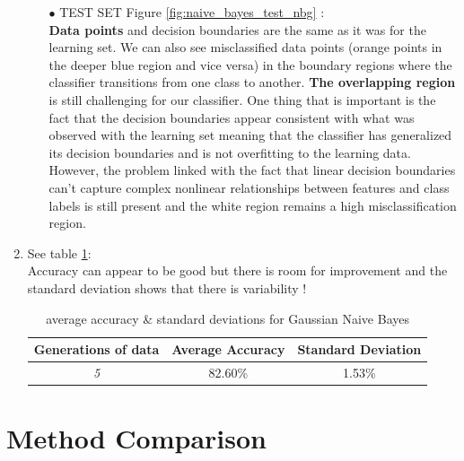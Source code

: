 \documentclass[acmconf,nonacm=true]{acmart}
\begin{document}
\begin{enumerate}
\begin{enumerate}
        \item[$\bullet$] TEST SET Figure \ref{fig:naive_bayes_test_nbg} : \\
        \textbf{Data points} and decision boundaries are the same as it was for the learning set. We can also see misclassified data points (orange points in the deeper blue region and vice versa) in the boundary regions where the classifier transitions from one class to another.
        \textbf{The overlapping region} is still challenging for our classifier.
        One thing that is important is the fact that the decision boundaries appear consistent with what was observed with the learning set meaning that the classifier has generalized its decision boundaries and is not overfitting to the learning data. However, the problem linked with the fact that linear decision boundaries can't capture complex nonlinear relationships between features and class labels is still present and the white region remains a high misclassification region.
    \end{enumerate}
    \item See table \ref{tab:accuracy_sd_nb}: \\
    Accuracy can appear to be good but there is room for improvement and the standard deviation shows that there is variability ! 
    \begin{table}[h]
    \centering
    \begin{tabular}{|c|c|c|}
        \hline
        \textbf{Generations of data} & \textbf{Average Accuracy} & \textbf{Standard Deviation} \\
        \hline
        \textit{5} & 82.60\% & 1.53\% \\
        \hline
    \end{tabular}
    \caption{average accuracy \& standard deviations for Gaussian Naive Bayes}
    \label{tab:accuracy_sd_nb}
    \end{table}
\end{enumerate}

\section{Method Comparison}
\end{document}
